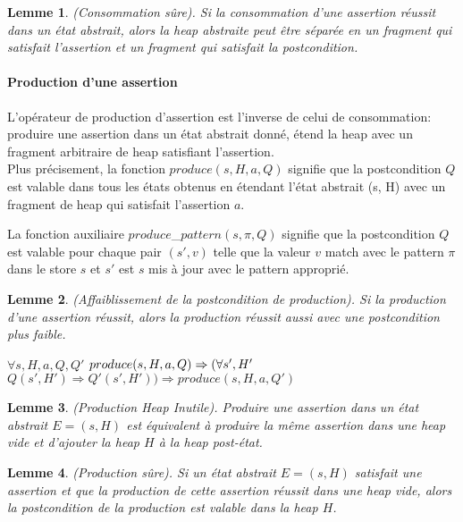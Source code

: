 \documentclass[11pt,openany]{article}
\newtheorem{lemme}{Lemme}
\begin{document}
	\begin{lemme}
		(Consommation s\^ure). Si la consommation d'une assertion r\'eussit dans un \'etat abstrait, alors la heap abstraite peut \^etre s\'epar\'ee en un fragment qui satisfait l'assertion et un fragment qui satisfait la postcondition.
	\end{lemme}
			\paragraph{Production d'une assertion}
		L'op\'erateur de production d'assertion est l'inverse de celui de consommation: produire une assertion dans un \'etat abstrait donn\'e, \'etend la heap avec un fragment arbitraire de heap satisfiant l'assertion.\\
		Plus pr\'ecisement, la fonction $produce(s,H,a,Q)$ signifie que la postcondition $Q$ est valable  dans tous les \'etats obtenus en \'etendant l'\'etat abstrait (s, H) avec un fragment de heap qui satisfait l'assertion $a$.\par
		La fonction auxiliaire $produce$_$pattern(s,\pi,Q)$ signifie que la postcondition $Q$ est valable pour chaque pair $(s',v)$ telle que la valeur $v$ match avec le pattern $\pi$ dans le store $s$ et $s'$ est $s$ mis \`a jour avec le pattern appropri\'e.\par 
		\begin{lemme}
			(Affaiblissement de la postcondition de production). Si la production d'une assertion r\'eussit, alors la production r\'eussit aussi avec une postcondition plus faible.\par
$\forall s,H,a,Q,Q'$ $produce(s,H,a,Q)\Rightarrow\\(\forall s', H'$ $Q(s',H')\Rightarrow Q'(s',H'))\Rightarrow produce(s,H,a,Q')$
		\end{lemme}	
		
		\begin{lemme}
		(Production Heap Inutile). Produire une assertion dans un \'etat abstrait $E = (s,H)$  est \'equivalent \`a produire la m\^eme assertion dans une heap vide et d'ajouter la heap $H$ \`a la heap post-\'etat.
		\end{lemme}
	
		\begin{lemme}
		(Production s\^ure). Si un \'etat abstrait $E=(s,H)$ satisfait une assertion et que la production de cette assertion r\'eussit dans une heap vide, alors la postcondition de la production est valable dans la heap $H$.
		\end{lemme}
\end{document}
